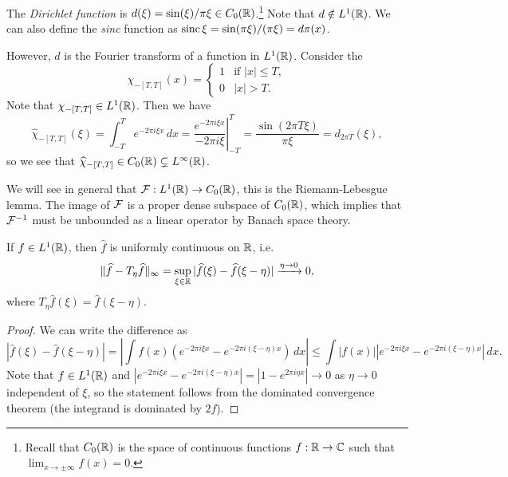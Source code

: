 \begin{example}
  The \emph{Dirichlet function}
  is $d(\xi) = \sin(\xi) / \pi \xi \in C_0(\mathbb{R})$.\footnote{Recall that $C_0(\mathbb{R})$ is the space of continuous functions $f : \mathbb{R} \to \mathbb{C}$ such that $\lim_{x \to \pm \infty} f(x) = 0$.}
  Note that $d \notin L^1(\mathbb{R})$.
  We can also define the
  \emph{sinc} function as
  $\operatorname{sinc} \xi = \sin(\pi \xi) / (\pi \xi) = d\pi(x)$.

  However, $d$ is the Fourier transform
  of a function in $L^1(\mathbb{R})$.
  Consider the
  \[
    \chi_{-[T, T]}(x) =
    \begin{cases}
      1 & \text{if } |x| \le T, \\
      0 & |x| > T.
    \end{cases}
  \]
  Note that $\chi_{-[T, T]} \in L^1(\mathbb{R})$.
  Then we have
  \[
    \widehat{\chi}_{-[T, T]}(\xi)
    = \int_{-T}^{T} e^{-2\pi i \xi x}\, dx
    = \left.\frac{e^{-2\pi i \xi x}}{-2\pi i \xi}\right|_{-T}^T
    = \frac{\sin(2\pi T \xi)}{\pi \xi}
    = d_{2\pi T}(\xi),
  \]
  so we see that
  $\widehat{\chi}_{-[T, T]} \in C_0(\mathbb{R}) \subsetneq L^\infty(\mathbb{R})$.
\end{example}

\begin{remark}
  We will see in general that
  $\mathcal{F} : L^1(\mathbb{R}) \to C_0(\mathbb{R})$,
  this is the Riemann-Lebesgue lemma.
  The image of $\mathcal{F}$ is a proper
  dense subspace of $C_0(\mathbb{R})$, which
  implies that $\mathcal{F}^{-1}$ must be unbounded
  as a linear operator by Banach space
  theory.
\end{remark}

\begin{prop}
  If $f \in L^1(\mathbb{R})$, then $\widehat{f}$
  is uniformly continuous on $\mathbb{R}$, i.e.
  \[
    \|\widehat{f} - T_\eta\widehat{f}\|_\infty
    = \sup_{\xi \in \mathbb{R}} |\widehat{f}(\xi) - \widehat{f}(\xi - \eta)|
    \xrightarrow{\eta \to 0} 0,
  \]
  where $T_\eta \widehat{f}(\xi) = \widehat{f}(\xi - \eta)$.
\end{prop}

\begin{proof}
  We can write the difference as
  \[
    |\widehat{f}(\xi) - \widehat{f}(\xi - \eta)|
    = \left|\int f(x) (e^{-2\pi i \xi x} - e^{-2\pi i (\xi - \eta)x})\, dx\right|
    \le \int |f(x)| |e^{-2\pi i \xi x} - e^{-2\pi i (\xi - \eta)x}|\, dx.
  \]
  Note that $f \in L^1(\mathbb{R})$ and
  $|e^{-2\pi i \xi x} - e^{-2\pi i (\xi - \eta)x}| = |1 - e^{2\pi i \eta x}| \to 0$
  as $\eta \to 0$
  independent of $\xi$, so the statement
  follows from the dominated convergence
  theorem (the integrand is dominated
  by $2f$).
\end{proof}

